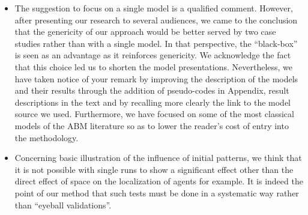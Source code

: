 \documentclass[11pt,a4paper,sans]{moderncv}        %
\begin{document}
\begin{itemize}
	\item The suggestion to focus on a single model is a qualified comment. However, after presenting our research to several audiences, we came to the conclusion that the genericity of our approach would be better served by two case studies rather than with a single model. In that perspective, the ``black-box'' is seen as an advantage as it reinforces genericity. We acknowledge the fact that this choice led us to shorten the model presentations. Nevertheless, we have taken notice of your remark by improving the description of the models and their results through the addition of pseudo-codes in Appendix, result descriptions in the text and by recalling more clearly the link to the model source we used. Furthermore, we have focused on some of the most classical models of the ABM literature so as to lower the reader's cost of entry into the methodology.
   
   \item Concerning basic illustration of the influence of initial patterns, we think that it is not possible with single runs to show a significant effect other than the direct effect of space on the localization of agents for example. It is indeed the point of our method that such tests must be done in a systematic way rather than ``eyeball validations''.
	

\end{itemize}
\end{document}
